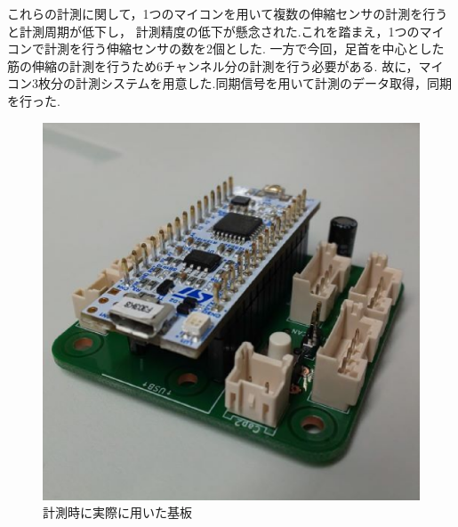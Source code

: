 これらの計測に関して，1つのマイコンを用いて複数の伸縮センサの計測を行うと計測周期が低下し，
計測精度の低下が懸念された.これを踏まえ，1つのマイコンで計測を行う伸縮センサの数を2個とした.
一方で今回，足首を中心とした筋の伸縮の計測を行うため6チャンネル分の計測を行う必要がある.
故に，マイコン3枚分の計測システムを用意した.同期信号を用いて計測のデータ取得，同期を行った.
\begin{figure}[h]
 \begin{center}
  \includegraphics[width=0.5\columnwidth,clip]{./2_measurement/circuit.eps}
  \caption{計測時に実際に用いた基板}
  \label{circuit}
 \end{center}
\end{figure}